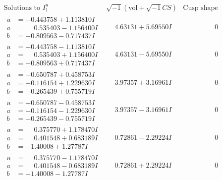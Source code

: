 \documentclass[1p]{elsarticle_modified}
\theoremstyle{definition}
\newcommand{\I}{\sqrt{-1}}
\begin{document}
$$\begin{array}{c|c|c}
 \end{array}$$\newpage$$\begin{array}{c|c|c}  
\text{Solutions to }I^u_{1}& \I (\text{vol} + \sqrt{-1}CS) & \text{Cusp shape}\\
 \hline 
\begin{aligned}
u &= -0.443758 + 1.113810 I \\
a &= \phantom{-}0.535403 - 1.156400 I \\
b &= -0.809563 - 0.717437 I\end{aligned}
 & \phantom{-}4.63131 + 5.69550 I & \phantom{-0.000000 } 0 \\ \hline\begin{aligned}
u &= -0.443758 - 1.113810 I \\
a &= \phantom{-}0.535403 + 1.156400 I \\
b &= -0.809563 + 0.717437 I\end{aligned}
 & \phantom{-}4.63131 - 5.69550 I & \phantom{-0.000000 } 0 \\ \hline\begin{aligned}
u &= -0.650787 + 0.458753 I \\
a &= -0.116154 + 1.229630 I \\
b &= -0.265439 + 0.755719 I\end{aligned}
 & \phantom{-}3.97357 + 3.16961 I & \phantom{-0.000000 } 0 \\ \hline\begin{aligned}
u &= -0.650787 - 0.458753 I \\
a &= -0.116154 - 1.229630 I \\
b &= -0.265439 - 0.755719 I\end{aligned}
 & \phantom{-}3.97357 - 3.16961 I & \phantom{-0.000000 } 0 \\ \hline\begin{aligned}
u &= \phantom{-}0.375770 + 1.178470 I \\
a &= \phantom{-}0.401548 + 0.683189 I \\
b &= -1.40008 + 1.27787 I\end{aligned}
 & \phantom{-}0.72861 - 2.29224 I & \phantom{-0.000000 } 0 \\ \hline\begin{aligned}
u &= \phantom{-}0.375770 - 1.178470 I \\
a &= \phantom{-}0.401548 - 0.683189 I \\
b &= -1.40008 - 1.27787 I\end{aligned}
 & \phantom{-}0.72861 + 2.29224 I & \phantom{-0.000000 } 0 \\ \hline\begin{aligned}

\end{aligned}
\end{array}$$
\end{document}
